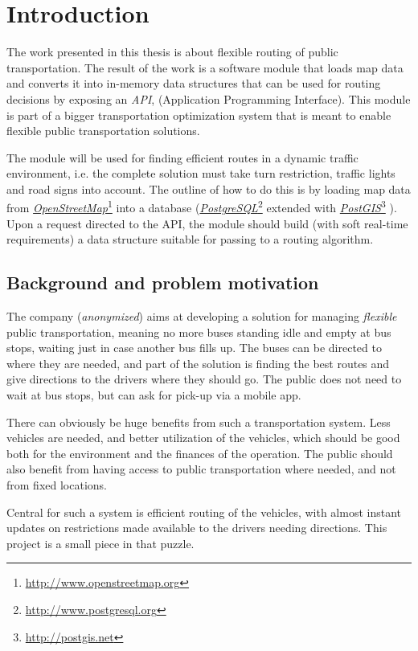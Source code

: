 \documentclass[../main.tex]{subfiles}
\begin{document}
\chapter{Introduction}
The work presented in this thesis is about flexible routing of public transportation. The result of the work is a software module that loads map data and converts it into in-memory data structures that can be used for routing decisions by exposing an \textit{API}, (Application Programming Interface). This module is part of a bigger transportation optimization system that is meant to enable flexible public transportation solutions. 

The module will be used for finding efficient routes in a dynamic traffic environment, i.e. the complete solution must take turn restriction, traffic lights and road signs into account. The outline of how to do this is by loading map data from \href{http://www.openstreetmap.org}{\textit{OpenStreetMap}}\footnote{\url{http://www.openstreetmap.org}} into a database (\href{http://www.postgresql.org}{\textit{PostgreSQL}}\footnote{\url{http://www.postgresql.org}} extended with \href{http://postgis.net}{\textit{PostGIS}}\footnote{\url{http://postgis.net}} ). Upon a request directed to the API, the module should build (with soft real-time requirements) a data structure suitable for passing to a routing algorithm.


\section{Background and problem motivation}
The company (\textit{anonymized}) aims at developing a solution for managing \emph{flexible} public transportation, meaning no more buses standing idle and empty at bus stops, waiting just in case another bus fills up. The buses can be directed to where they are needed, and part of the solution is finding the best routes and give directions to the drivers where they should go. The public does not need to wait at bus stops, but can ask for pick-up via a mobile app.

There can obviously be huge benefits from such a transportation system. Less vehicles are needed, and better utilization of the vehicles, which should be good both for the environment and the finances of the operation. The public should also benefit from having access to public transportation where needed, and not from fixed locations.

Central for such a system is efficient routing of the vehicles, with almost instant updates on restrictions made available to the drivers needing directions. This project is a small piece in that puzzle.
\end{document}
